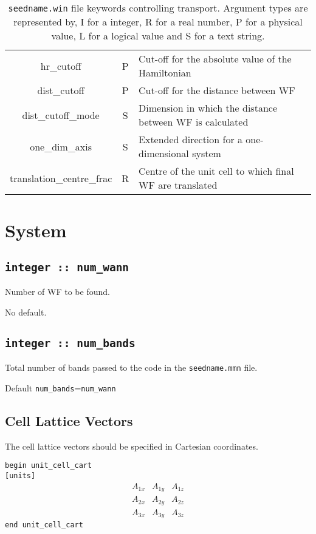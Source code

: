 \begin{table}
\begin{center}
\begin{tabular}{|c|c|p{6cm}|}
{\sc hr\_cutoff} & P &  Cut-off for the absolute value of the Hamiltonian \\
{\sc dist\_cutoff} & P & Cut-off for the distance between WF \\
{\sc dist\_cutoff\_mode} & S & Dimension in which the distance between WF
is calculated \\
{\sc one\_dim\_axis} & S &  Extended direction for a one-dimensional system \\
{\sc translation\_centre\_frac } & R & Centre of the unit cell to which
final WF are translated \\
\hline
\end{tabular}
\caption[Parameter file keywords controlling transport.]
{{\tt seedname.win} file keywords controlling transport. Argument types
are represented by, I for a integer, R for a real number, P for a
physical value, L for a logical value and S for a text string.}
\label{parameter_keywords7}
\end{center}
\end{table}

\clearpage


\section{System}

\subsection[num\_wann]{\tt integer :: num\_wann}
Number of WF to be found.

No default.

\subsection[num\_bands]{\tt integer :: num\_bands}

Total number of bands passed to the code in the {\tt seedname.mmn} file.

Default \verb#num_bands#=\verb#num_wann#

\subsection[Cell Lattice Vectors]{Cell Lattice Vectors}

The cell lattice vectors should be specified in Cartesian coordinates.


\noindent \verb#begin unit_cell_cart# \\
\verb#[units]#
$$
\begin{array}{ccc}
A_{1x} & A_{1y} & A_{1z} \\
A_{2x} & A_{2y} & A_{2z} \\
A_{3x} & A_{3y} & A_{3z}
\end{array}
$$
\verb#end unit_cell_cart#

